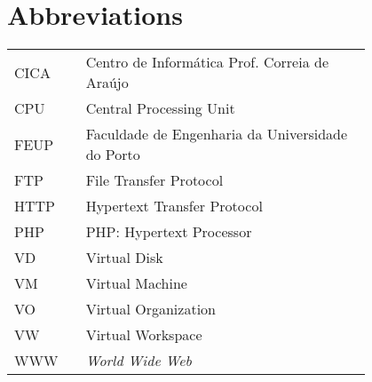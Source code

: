 \chapter*{Abbreviations}

\begin{flushleft}
\begin{tabular}{l p{0.8\linewidth}}
CICA	 & Centro de Informática Prof. Correia de Araújo\\
CPU	 & Central Processing Unit\\
FEUP	 & Faculdade de Engenharia da Universidade do Porto\\
FTP	 & File Transfer Protocol\\
HTTP	 & Hypertext Transfer Protocol\\
PHP	 & PHP: Hypertext Processor\\
VD	 & Virtual Disk\\
VM	 & Virtual Machine\\
VO	 & Virtual Organization\\
VW	 & Virtual Workspace\\
WWW      & \emph{World Wide Web}
\end{tabular}
\end{flushleft}

